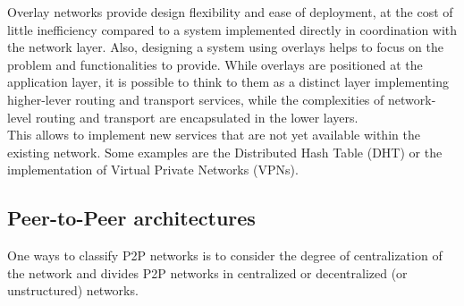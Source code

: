 Overlay networks provide design flexibility and ease of deployment, at the cost of little inefficiency compared to a system implemented directly in coordination with the network layer. Also, designing a system using overlays helps to focus on the problem and functionalities to provide. While overlays are positioned at the application layer, it is possible to think to them as a distinct layer implementing higher-lever routing and transport services, while the complexities of network-level routing and transport are encapsulated in the lower layers.
\\

This allows to implement new services that are not yet available within the existing network. Some examples are the Distributed Hash Table (DHT) or the implementation of Virtual Private Networks (VPNs). 




\subsection{Peer-to-Peer architectures}
One ways to classify P2P networks is to consider the degree of centralization of the network and divides P2P networks in centralized or decentralized (or unstructured) networks.
\\

